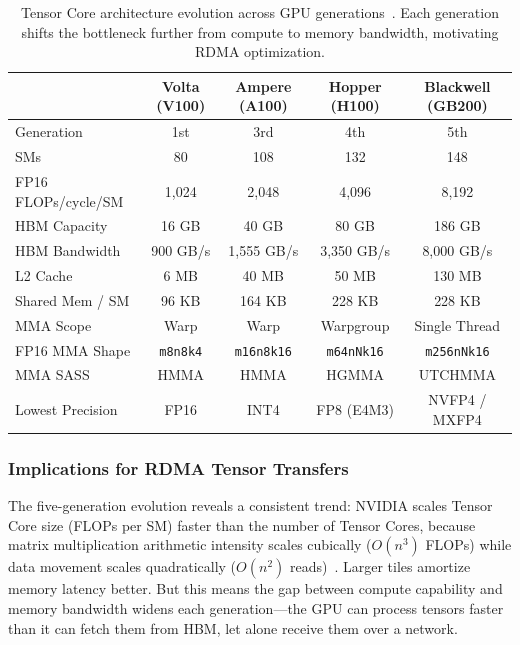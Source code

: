 \documentclass[11pt,letterpaper]{article}
\theoremstyle{definition}
\begin{document}
\begin{table}[htbp]
\centering
\caption{Tensor Core architecture evolution across GPU generations~\cite{patel2025tensorcore}. Each generation shifts the bottleneck further from compute to memory bandwidth, motivating RDMA optimization.}
\label{tab:tensorcore-evolution}
\small
\begin{tabular}{@{}lcccc@{}}
\toprule
& \textbf{Volta (V100)} & \textbf{Ampere (A100)} & \textbf{Hopper (H100)} & \textbf{Blackwell (GB200)} \\
\midrule
Generation & 1st & 3rd & 4th & 5th \\
SMs & 80 & 108 & 132 & 148 \\
FP16 FLOPs/cycle/SM & 1,024 & 2,048 & 4,096 & 8,192 \\
HBM Capacity & 16 GB & 40 GB & 80 GB & 186 GB \\
HBM Bandwidth & 900 GB/s & 1,555 GB/s & 3,350 GB/s & 8,000 GB/s \\
L2 Cache & 6 MB & 40 MB & 50 MB & 130 MB \\
Shared Mem / SM & 96 KB & 164 KB & 228 KB & 228 KB \\
MMA Scope & Warp & Warp & Warpgroup & Single Thread \\
FP16 MMA Shape & \texttt{m8n8k4} & \texttt{m16n8k16} & \texttt{m64nNk16} & \texttt{m256nNk16} \\
MMA SASS & HMMA & HMMA & HGMMA & UTCHMMA \\
Lowest Precision & FP16 & INT4 & FP8 (E4M3) & NVFP4 / MXFP4 \\
\bottomrule
\end{tabular}
\end{table}

\subsubsection{Implications for RDMA Tensor Transfers}

The five-generation evolution reveals a consistent trend: NVIDIA scales Tensor Core size (FLOPs per SM) faster than the number of Tensor Cores, because matrix multiplication arithmetic intensity scales cubically ($O(n^3)$ FLOPs) while data movement scales quadratically ($O(n^2)$ reads)~\cite{patel2025tensorcore}. Larger tiles amortize memory latency better. But this means the gap between compute capability and memory bandwidth widens each generation---the GPU can process tensors faster than it can fetch them from HBM, let alone receive them over a network.
\end{document}
